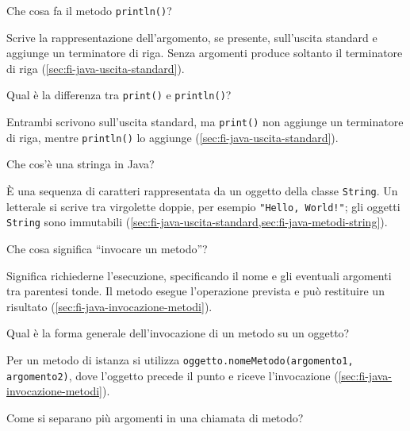 \begin{exercise}
\label{ex:fi-esercizi-introduzione-java-println}
Che cosa fa il metodo \texttt{println()}?
\end{exercise}

Scrive la rappresentazione dell'argomento, se presente, sull'uscita standard
e aggiunge un terminatore di riga. Senza argomenti produce soltanto
il terminatore di riga (\cref{sec:fi-java-uscita-standard}).

\begin{exercise}
\label{ex:fi-esercizi-introduzione-java-print-vs-println}
Qual è la differenza tra \texttt{print()} e \texttt{println()}?
\end{exercise}

Entrambi scrivono sull'uscita standard, ma \texttt{print()} non aggiunge un
terminatore di riga, mentre \texttt{println()} lo aggiunge
(\cref{sec:fi-java-uscita-standard}).

\begin{exercise}
\label{ex:fi-esercizi-introduzione-java-stringa}
Che cos'è una stringa in Java?
\end{exercise}

È una sequenza di caratteri rappresentata da un oggetto della classe
\texttt{String}. Un letterale si scrive tra virgolette doppie, per esempio
\texttt{"Hello, World!"}; gli oggetti \texttt{String} sono immutabili
(\cref{sec:fi-java-uscita-standard,sec:fi-java-metodi-string}).

\begin{exercise}
\label{ex:fi-esercizi-introduzione-java-invocare-metodo}
Che cosa significa ``invocare un metodo''?
\end{exercise}

Significa richiederne l'esecuzione, specificando il nome e gli eventuali
argomenti tra parentesi tonde. Il metodo esegue l'operazione prevista e può
restituire un risultato (\cref{sec:fi-java-invocazione-metodi}).

\begin{exercise}
\label{ex:fi-esercizi-introduzione-java-forma-invocazione}
Qual è la forma generale dell'invocazione di un metodo su un oggetto?
\end{exercise}

Per un metodo di istanza si utilizza \texttt{oggetto.nomeMetodo(argomento1,
argomento2)}, dove l'oggetto precede il punto e riceve l'invocazione
(\cref{sec:fi-java-invocazione-metodi}).

\begin{exercise}
\label{ex:fi-esercizi-introduzione-java-argomenti-separazione}
Come si separano più argomenti in una chiamata di metodo?
\end{exercise}

